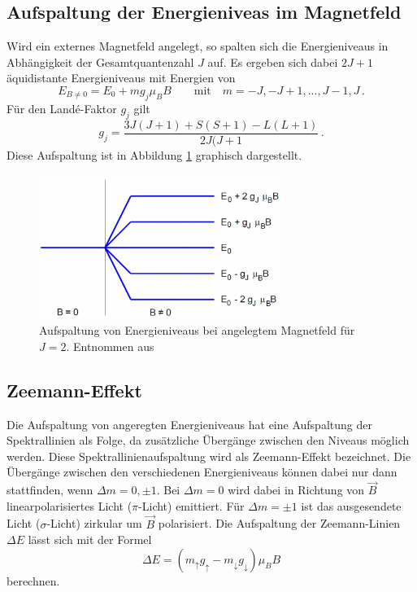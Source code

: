     \subsection{Aufspaltung der Energieniveas im Magnetfeld}
        Wird ein externes Magnetfeld angelegt, so spalten sich die Energieniveaus in Abhängigkeit der Gesamtquantenzahl $J$ auf.
        Es ergeben sich dabei $2J+1$ äquidistante Energieniveaus mit Energien von
        \begin{equation}
            E_{B\neq 0}=E_0+mg_j\mu_BB \qquad\text{mit}\quad m=-J,-J+1,...,J-1,J \, .
            \label{eqn:E}
        \end{equation}
        Für den Landé-Faktor $g_j$ gilt
        \begin{equation}
            g_j=\frac{3J(J+1)+S(S+1)-L(L+1)}{2J(J+1} \, .
        \end{equation}
        Diese Aufspaltung ist in Abbildung \ref{fig:Aufspaltung} graphisch dargestellt.
        \begin{figure}[h]
            \centering
            \includegraphics[width = 0.7\textwidth]{pictures/aufspaltung.png}
            \caption{Aufspaltung von Energieniveaus bei angelegtem Magnetfeld für $J=2$. Entnommen aus \cite{haken_atom-_2004}}
            \label{fig:Aufspaltung}
        \end{figure}
    \subsection{Zeemann-Effekt}
        Die Aufspaltung von angeregten Energieniveaus hat eine Aufspaltung der Spektrallinien als Folge,
        da zusätzliche Übergänge zwischen den Niveaus möglich werden.
        Diese Spektrallinienaufspaltung wird als Zeemann-Effekt bezeichnet.
        Die Übergänge zwischen den verschiedenen Energieniveaus können dabei nur dann stattfinden, wenn $\Delta m=0,\pm 1$.
        Bei $\Delta m=0$ wird dabei in Richtung von $\vec{B}$ linearpolarisiertes Licht ($\pi$-Licht) emittiert.
        Für $\Delta m=\pm 1$ ist das ausgesendete Licht ($\sigma$-Licht) zirkular um $\vec{B}$ polarisiert.
        Die Aufspaltung der Zeemann-Linien $\Delta E$ lässt sich mit der Formel
        \begin{equation}
            \Delta E= \left(m_\uparrow g_\uparrow-m_\downarrow g_\downarrow \right)\mu_BB
        \end{equation}
        berechnen.

